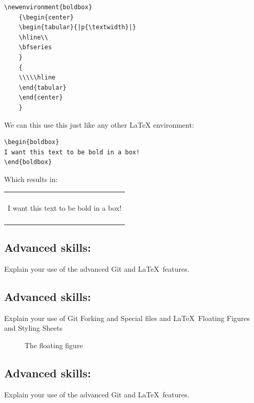\documentclass[a4paper, 11pt]{report}
\newenvironment{boldbox}
    {\begin{center}
    \begin{tabular}{|p{0.9\textwidth}|}
    \hline\\
    \bfseries
    }
    { 
    \\\\\hline
    \end{tabular} 
    \end{center}
    }
\begin{document}
\begin{verbatim}
\newenvironment{boldbox}
    {\begin{center}
    \begin{tabular}{|p{\textwidth}|}
    \hline\\
    \bfseries
    }
    { 
    \\\\\hline
    \end{tabular} 
    \end{center}
    }
\end{verbatim}

We can this use this just like any other LaTeX environment:

\begin{verbatim}
\begin{boldbox}
I want this text to be bold in a box!
\end{boldbox}
\end{verbatim}

Which results in:

\begin{boldbox}
I want this text to be bold in a box!
\end{boldbox}



\newpage

\subsection{Advanced skills: \studB}

Explain your use of the advanced Git and \LaTeX\ features. 

\subsection{Advanced skills: \studC}

Explain your use of Git Forking and Special files and \LaTeX\ Floating Figures and Styling Sheets

\begin{figure}[b]
The floating figure
\end{figure}

\subsection{Advanced skills: \studD}

Explain your use of the advanced Git and \LaTeX\ features. 
\end{document}
